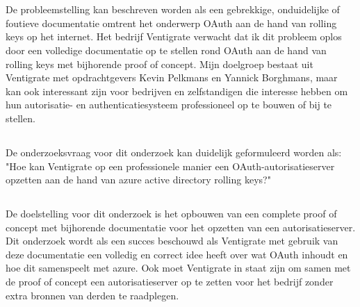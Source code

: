 
\chapter{}
\label{ch:inleiding}
\section{}
\label{sec:probleemstelling}

De probleemstelling kan beschreven worden als een gebrekkige, onduidelijke of foutieve documentatie omtrent het onderwerp OAuth aan de hand van rolling keys op het internet. Het bedrijf Ventigrate verwacht dat ik dit probleem oplos door een volledige documentatie op te stellen rond OAuth aan de hand van rolling keys met bijhorende proof of concept. \newline\newline
Mijn doelgroep bestaat uit Ventigrate met opdrachtgevers Kevin Pelkmans en Yannick Borghmans, maar kan ook interessant zijn voor bedrijven en zelfstandigen die interesse hebben om hun autorisatie- en authenticatiesysteem professioneel op te bouwen of bij te stellen.

\section{}
\label{sec:onderzoeksvraag}

De onderzoeksvraag voor dit onderzoek kan duidelijk geformuleerd worden als: "Hoe kan Ventigrate op een professionele manier een OAuth-autorisatieserver opzetten aan de hand van azure active directory rolling keys?" 

\section{}
\label{sec:onderzoeksdoelstelling}

De doelstelling voor dit onderzoek is het opbouwen van een complete proof of concept met bijhorende documentatie voor het opzetten van een autorisatieserver. Dit onderzoek wordt als een succes beschouwd als Ventigrate met gebruik van deze documentatie een volledig en correct idee heeft over wat OAuth inhoudt en hoe dit samenspeelt met azure. Ook moet Ventigrate in staat zijn om samen met de proof of concept een autorisatieserver op te zetten voor het bedrijf zonder extra bronnen van derden te raadplegen.

